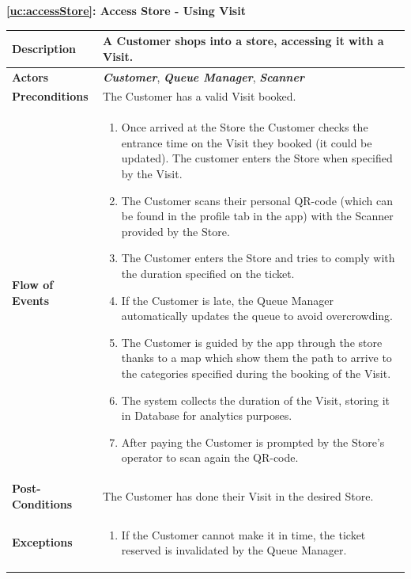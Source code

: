 \documentclass[a4paper, 12pt, oneside]{article}
\begin{document}
\begin{center}
{\textbf{\ref{uc:accessStore}: Access Store - Using Visit}}
\end{center}
\begin{tabularx}{\linewidth}{| l | X |}
    
    \hline
    \textbf{Description} & A Customer shops into a store, accessing it with a Visit.\\
    

    \hline
    \textbf{Actors} & \textbf{\textit{Customer}}, \textit{\textbf{Queue Manager}}, \textit{\textbf{Scanner}}  \\
    
    \hline
    \textbf{Preconditions} & The Customer has a valid Visit booked.\\
    
    \hline
    \textbf{Flow of Events} & \parbox{0.7\textwidth}{   
        \begin{enumerate}
            \item Once arrived at the Store the Customer checks the entrance time on the Visit they booked (it could be updated). The customer enters the Store when specified by the Visit.
            \item The Customer scans their personal QR-code (which can be found in the profile tab in the app) with the Scanner provided by the Store.
            \item The Customer enters the Store and tries to comply with the duration specified on the ticket.
            \item If the Customer is late, the Queue Manager automatically updates the queue to avoid overcrowding.
            \item The Customer is guided by the app through the store thanks to a map which show them the path to arrive to the categories specified during the booking of the Visit.
            \item The system collects the duration of the Visit, storing it in Database for analytics purposes.
            \item After paying the Customer is prompted by the Store's operator to scan again the QR-code.
    \end{enumerate}}\\
    
    \hline
    \textbf{Post-Conditions} & The Customer has done their Visit in the desired Store.\\
    
    \hline
    \textbf{Exceptions} & \parbox{0.7\textwidth}{ \begin{enumerate}
            \item If the Customer cannot make it in time, the ticket reserved is invalidated by the Queue Manager.
        \end{enumerate}}\\

    \hline
\end{tabularx}
\end{document}
